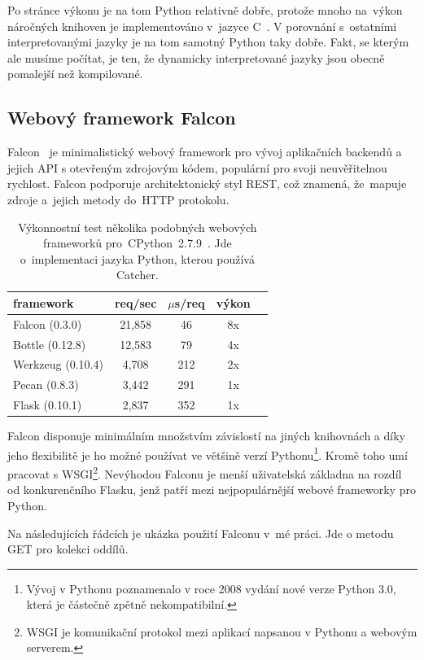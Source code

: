 Po stránce výkonu je na tom Python relativně dobře, protože mnoho na~výkon náročných knihoven je implementováno v~jazyce C~\cite{clanguage}.
V porovnání s~ostatními interpretovanými jazyky je na tom samotný Python taky dobře.
Fakt, se kterým ale musíme počítat, je ten, že dynamicky interpretované jazyky jsou obecně pomalejší než kompilované.

\subsection{Webový framework Falcon}

Falcon~\cite{falcon} je minimalistický webový framework pro vývoj aplikačních back\-endů a jejich API s otevřeným zdrojovým kódem,
populární pro svoji neuvěřitelnou rychlost. Falcon podporuje architektonický styl REST, což znamená, že~mapuje zdroje a~jejich metody do~HTTP protokolu.

\begin{table}[htb]
 \centering
 \begin{tabular}{|l||c|c|c|c|}\hline
 \bfseries \bfseries framework & \bfseries req/sec & \bfseries $\mu$s/req & \bfseries výkon \\[2mm]
 \hline
 Falcon (0.3.0) & 21,858 & 46 & 8x \\
 \hline
 Bottle (0.12.8) & 12,583 & 79 & 4x \\
 \hline
 Werkzeug (0.10.4) & 4,708 & 212 & 2x \\
 \hline
 Pecan (0.8.3) & 3,442 & 291 & 1x \\
 \hline
 Flask (0.10.1) & 2,837 & 352 & 1x \\
 \hline
 \end{tabular}
 \caption{Výkonnostní test několika podobných webových frameworků pro~CPython~2.7.9~\cite{falcon_benchmarks}.
 Jde o~implementaci jazyka Python, kterou používá Catcher.}
\end{table}

Falcon disponuje minimálním množstvím závislostí na jiných knihovnách a díky jeho flexibilitě je ho možné
používat ve většině verzí Pythonu\footnote{Vývoj v Pythonu poznamenalo v roce 2008 vydání nové verze Python 3.0,
která je částečně zpětně nekompatibilní.}. Kromě toho umí pracovat s WSGI\footnote{WSGI je komunikační protokol
mezi aplikací napsanou v Pythonu a webovým serverem.}. Nevýhodou Falconu je menší uživatelská
základna na rozdíl od konkurenčního Flasku, jenž patří mezi nejpopulárnější webové frameworky pro Python.

Na následujících řádcích je ukázka použití Falconu v~mé práci. Jde o metodu GET pro kolekci oddílů.

